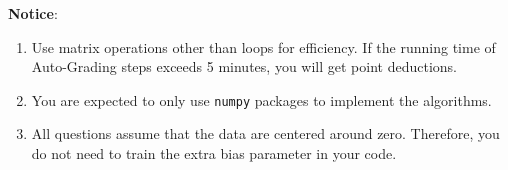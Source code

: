 \documentclass[a4paper, 12pt]{exam}
\begin{document}
\nocite{*}
\begin{flushleft}
\textbf{Notice}: \\
\begin{enumerate}
\item Use matrix operations other than loops for efficiency. If the running time of Auto-Grading steps exceeds 5 minutes, you will get point deductions.
\item You are expected to only use \texttt{numpy} packages to implement the algorithms.
\item All questions assume that the data are centered around zero. Therefore, you do not need to train the extra bias parameter in your code.
\end{enumerate}
\end{flushleft}

%
%
\end{document}
